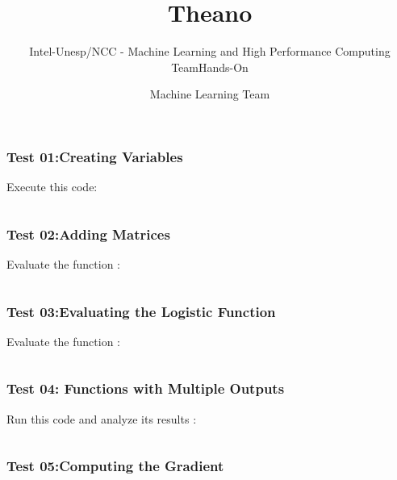\documentclass[aspectratio=169]{beamer}
\title[Short title]{Theano}
\subtitle{Intel-Unesp/NCC - Machine Learning and High Performance Computing Team}
\subtitle{Hands-On}
\author{Machine Learning Team}
\begin{document}
\begin{frame}
\titlepage 
\end{frame}

\begin{frame}
\frametitle{Test 01:Creating Variables }
Execute this code:
\\[0.5cm]
\inputminted{python}{./aux_files/th0.py}
\end{frame}

\begin{frame}
\frametitle{Test 02:Adding Matrices }
Evaluate the function : 
\\[0.5cm]
\inputminted{python}{./aux_files/th1.py}
\end{frame}

\begin{frame}
\frametitle{Test 03:Evaluating the Logistic Function }
Evaluate the function :
\\[0.5cm]
\inputminted{python}{./aux_files/th2.py}
\end{frame}

\begin{frame}
\frametitle{Test 04: Functions with Multiple Outputs }
Run this code and analyze its results :
\\[0.5cm]
\inputminted{python}{./aux_files/th3.py}
\end{frame}

\begin{frame}
\frametitle{Test 05:Computing the Gradient }
\inputminted{python}{./aux_files/th4.py}
\end{frame}
\end{document}
